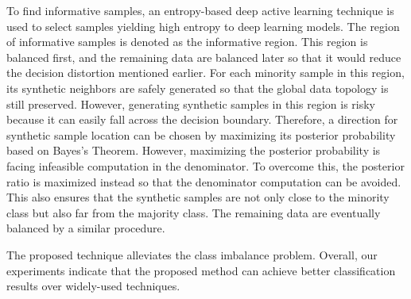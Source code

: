 \documentclass[journal]{IEEEtai}
\begin{document}
To find informative samples, an entropy-based deep active learning technique is used to select samples yielding high entropy to deep learning models. The region of informative samples is denoted as the informative region. This region is balanced first, and the remaining data are balanced later so that it would reduce the decision distortion mentioned earlier. For each minority sample in this region, its synthetic neighbors are safely generated so that the global data topology is still preserved. However, generating synthetic samples in this region is risky because it can easily fall across the decision boundary. Therefore, a direction for synthetic sample location can be chosen by maximizing its posterior probability based on Bayes's Theorem. However, maximizing the posterior probability is facing infeasible computation in the denominator. To overcome this, the posterior ratio is maximized instead so that the denominator computation can be avoided. This also ensures that the synthetic samples are not only close to the minority class but also far from the majority class. The remaining data are eventually balanced by a similar procedure. 

The proposed technique alleviates the class imbalance problem. Overall, our experiments indicate that the proposed method can achieve better classification results over widely-used techniques.
\end{document}
